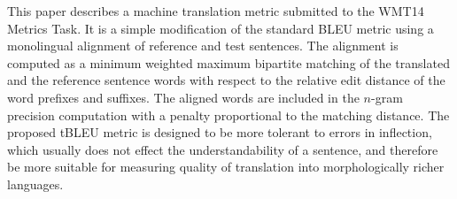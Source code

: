 This paper describes a machine translation metric submitted to the WMT14 Metrics Task. It is a simple modification of the standard BLEU metric using a monolingual alignment of reference and test sentences. The alignment is computed as a minimum weighted maximum bipartite matching of the translated and the reference sentence words with respect to the relative edit distance of the word prefixes and suffixes. The aligned words are included in the $n$-gram precision computation with a penalty proportional to the matching distance. The proposed tBLEU metric is designed to be more tolerant to errors in inflection, which usually does not effect the understandability of a sentence, and therefore be more suitable for measuring quality of translation into morphologically richer languages.
